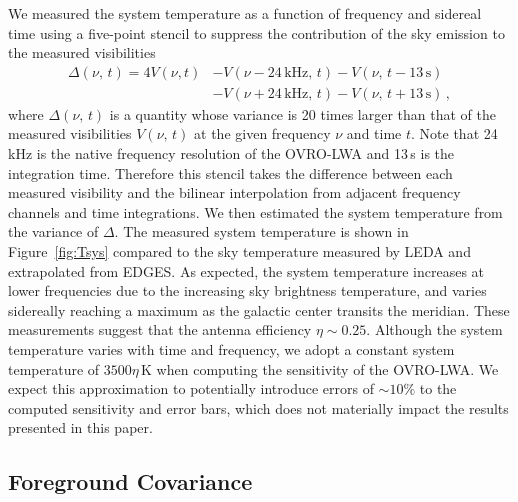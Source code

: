 \documentclass[twocolumn]{aastex62}
\begin{document}
We measured the system temperature as a function of frequency and sidereal time using a five-point
stencil to suppress the contribution of the sky emission to the measured visibilities
\begin{align*}
    \Delta(\nu,\,t) = 4V(\nu, t)
                     &- V(\nu - 24\,\text{kHz},\,t)
                      - V(\nu,\,t - 13\,\text{s}) \\
                     &- V(\nu + 24\,\text{kHz},\,t)
                      - V(\nu,\,t + 13\,\text{s})\,,
\end{align*}
where $\Delta(\nu,\,t)$ is a quantity whose variance is 20 times larger than that of the measured
visibilities $V(\nu,\,t)$ at the given frequency $\nu$ and time $t$. Note that 24\,kHz is the native
frequency resolution of the OVRO-LWA and 13\,s is the integration time.  Therefore this stencil
takes the difference between each measured visibility and the bilinear interpolation from adjacent
frequency channels and time integrations. We then estimated the system temperature from the variance
of $\Delta$. The measured system temperature is shown in Figure~\ref{fig:Tsys} compared to the sky
temperature measured by LEDA and extrapolated from EDGES.  As expected, the system temperature
increases at lower frequencies due to the increasing sky brightness temperature, and varies
sidereally reaching a maximum as the galactic center transits the meridian. These measurements
suggest that the antenna efficiency $\eta \sim 0.25$. Although the system temperature varies with
time and frequency, we adopt a constant system temperature of $3500\eta\,\text{K}$ when computing
the sensitivity of the OVRO-LWA. We expect this approximation to potentially introduce errors of
$\sim 10\%$ to the computed sensitivity and error bars, which does not materially impact the results
presented in this paper.

\subsection{Foreground Covariance}\label{sec:foreground-covariance}
\end{document}
